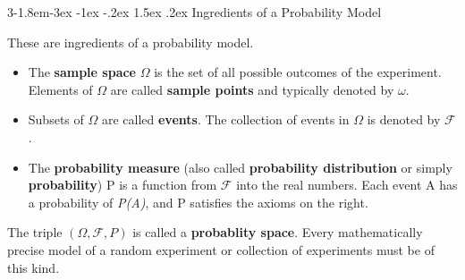 \documentclass{tufte-handout}
\makeatletter
\renewcommand{\subsection}{\@startsection{subsection}%
    {3}{-1.8em}{-3ex \@plus -1ex \@minus -.2ex}%
    {1.5ex \@plus .2ex}
    {\hspace*{-5.5em}\fcolorbox{ltblue}{ltblue}{\parbox[c][1.0ex][b]{4em}{\phantom{space}}}
    \normalfont\large\itshape\color{ltblue}}}
\makeatother
\begin{document}
    \subsection{Ingredients of a Probability Model}


        \begin{Definition}
            These are ingredients of a probability model. \\
            \begin{itemize}
                \item The \textbf{sample space} $\Omega$ is the set of all possible outcomes of
                the experiment. Elements of $ \Omega $ are called \textbf{sample points} 
                and typically denoted by $ \omega $.
                \item Subsets of $ \Omega $ are called \textbf{events}. 
                The collection of events in $ \Omega $ is denoted by $ \mathcal{F} $.
                \item The \textbf{probability measure} 
                (also called \textbf{probability distribution} or simply \textbf{probability})
                P is a function from $ \mathcal{F} $ into the real numbers. 
                Each event A has a probability of \textit{P(A)}, and
                P satisfies the axioms on the right. 
            \end{itemize}
            The triple $ (\Omega, \mathcal{F}, \mathit{P}) $ is called a \textbf{probablity space}. 
            Every mathematically precise model of a random experiment or collection of experiments must be 
            of this kind.

        \end{Definition}
\end{document}
